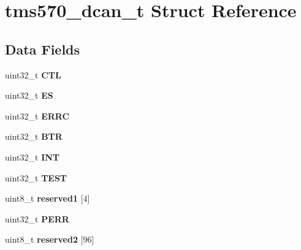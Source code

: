 \hypertarget{structtms570__dcan__t}{}\section{tms570\+\_\+dcan\+\_\+t Struct Reference}
\label{structtms570__dcan__t}
\subsection*{Data Fields}
\begin{DoxyCompactItemize}
\item 
\mbox{\label{structtms570__dcan__t_a7025c6204612419630c8372058743ace}} 
uint32\+\_\+t {\bfseries C\+TL}
\item 
\mbox{\label{structtms570__dcan__t_aa8e78d9deacc8bd4a68eb3f90d51f760}} 
uint32\+\_\+t {\bfseries ES}
\item 
\mbox{\label{structtms570__dcan__t_a0ed3e3ce0375d112f28090045c114fe1}} 
uint32\+\_\+t {\bfseries E\+R\+RC}
\item 
\mbox{\label{structtms570__dcan__t_ac6843fd7d57bf80569e1059eee17af07}} 
uint32\+\_\+t {\bfseries B\+TR}
\item 
\mbox{\label{structtms570__dcan__t_a1373150e99ebf518d1061913383eaa01}} 
uint32\+\_\+t {\bfseries I\+NT}
\item 
\mbox{\label{structtms570__dcan__t_ab8f5f1bad1e3d1e8cf02012d01ed0483}} 
uint32\+\_\+t {\bfseries T\+E\+ST}
\item 
\mbox{\label{structtms570__dcan__t_a986053bfd6d1b7a6fa1403a0b73c35e8}} 
uint8\+\_\+t {\bfseries reserved1} \mbox{[}4\mbox{]}
\item 
\mbox{\label{structtms570__dcan__t_a898271a27e5417c2fec64250fbc67824}} 
uint32\+\_\+t {\bfseries P\+E\+RR}
\item 
\mbox{\label{structtms570__dcan__t_a1c97db3a4eb380ec6dc1d02f256304b6}} 
uint8\+\_\+t {\bfseries reserved2} \mbox{[}96\mbox{]}

\end{DoxyCompactItemize}
